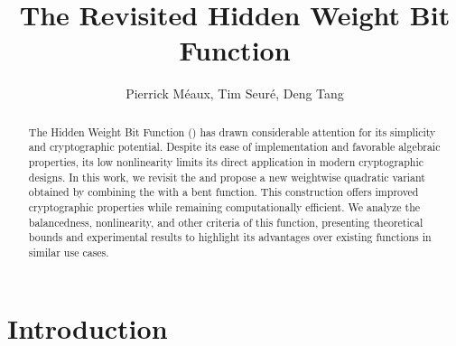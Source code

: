 \documentclass[11pt]{llncs}
\begin{document}
    \setcounter{page}{1} 
	\title{The Revisited Hidden Weight Bit Function}

	
\author{
	Pierrick M\'eaux,
	Tim Seuré, 
	Deng Tang
}

	

	
	
	
	\maketitle


	
	\begin{abstract}
	The Hidden Weight Bit Function (\hwbf{}) has drawn considerable attention for its simplicity and cryptographic potential. Despite its ease of implementation and favorable algebraic properties, its low nonlinearity limits its direct application in modern cryptographic designs. In this work, we revisit the \hwbf{} and propose a new weightwise quadratic variant obtained by combining the \hwbf{} with a bent function. This construction offers improved cryptographic properties while remaining computationally efficient. We analyze the balancedness, nonlinearity, and other criteria of this function, presenting theoretical bounds and experimental results to highlight its advantages over existing functions in similar use cases. 
	\end{abstract}
    

\section{Introduction}

\end{document}
